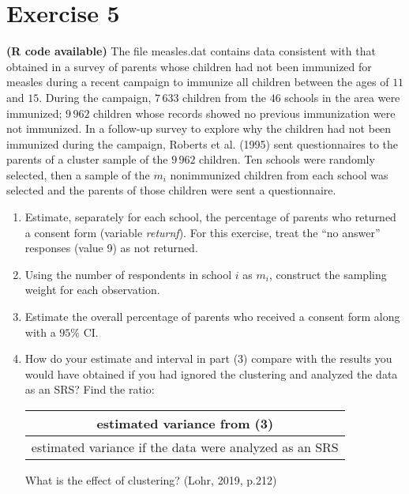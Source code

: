 \documentclass[12pt]{article}
\begin{document}
\section*{Exercise 5}
\textbf{\color{ForestGreen}(R code available)} The file measles.dat contains data consistent with that obtained in a survey of parents
whose children had not been immunized for measles during a recent campaign to
immunize all children between the ages of $11$ and $15$. During the campaign, $7\,633$ children
from the $46$ schools in the area were immunized; $9\,962$ children whose records
showed no previous immunization were not immunized. In a follow-up survey to
explore why the children had not been immunized during the campaign, Roberts
et al. (1995) sent questionnaires to the parents of a cluster sample of the $9\,962$ children.
Ten schools were randomly selected, then a sample of the $m_i$ nonimmunized
children from each school was selected and the parents of those children were sent a
questionnaire.
\begin{enumerate}
\item Estimate, separately for each school, the percentage of parents who returned a consent form (variable \emph{returnf}). For this exercise, treat the “no answer” responses (value 9) as not returned.
\item Using the number of respondents in school $i$ as $m_i$, construct the sampling weight for each observation.
\item Estimate the overall percentage of parents who received a consent form along with a $95\%$ CI.
\item How do your estimate and interval in part (3) compare with the results you would have obtained if you had ignored the clustering and analyzed the data as an SRS?
Find the ratio:
\begin{center}
\begin{tabular}{c}
estimated variance from (3) \\
\hline
estimated variance if the data were analyzed as an SRS  \\
\end{tabular}
\end{center}
What is the effect of clustering? \hfill (Lohr, 2019, p.212)
\end{enumerate}
\end{document}
